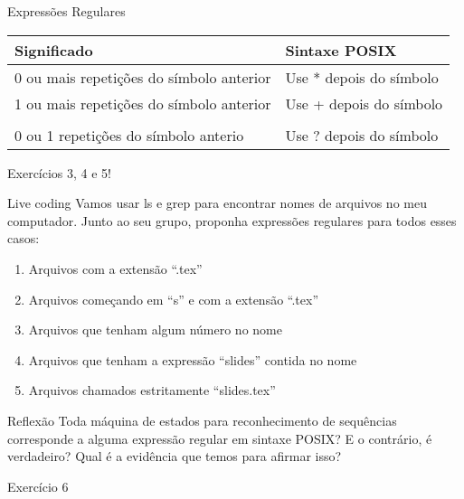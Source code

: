 \documentclass{beamer}
\begin{document}
\begin{frame}[fragile]{Expressões Regulares}
  \centering
  \large
  \begin{tabular}{p{5cm} | p{5cm} }
    Significado & Sintaxe POSIX \\ \hline
    0 ou mais repetições do símbolo anterior & Use * depois do símbolo
    \\ \hline
    1 ou mais repetições do símbolo anterior & Use + depois do símbolo \\ \hline
    \\
    0 ou 1 repetições do símbolo anterio & Use ? depois do símbolo \\ \hline
  \end{tabular}

  Exercícios 3, 4 e 5!

\end{frame}

\begin{frame}{Live coding}
  \centering
  \large
  Vamos usar ls e grep para encontrar nomes de arquivos no meu computador. Junto
  ao seu grupo, proponha expressões regulares para todos esses casos:
  \begin{enumerate}
    \item Arquivos com a extensão ``.tex''
    \item Arquivos começando em ``s'' e com a extensão ``.tex''
    \item Arquivos que tenham algum número no nome
    \item Arquivos que tenham a expressão ``slides'' contida no nome
    \item Arquivos chamados estritamente ``slides.tex''
  \end{enumerate}
\end{frame}

\begin{frame}{Reflexão}
  \centering
  \Large
  Toda máquina de estados para reconhecimento de sequências corresponde a alguma
  expressão regular em sintaxe POSIX? E o contrário, é verdadeiro? Qual é a
  evidência que temos para afirmar isso?
\end{frame}

\begin{frame}{Exercício 6}
  \centering
  \Large
\end{frame}
\end{document}
